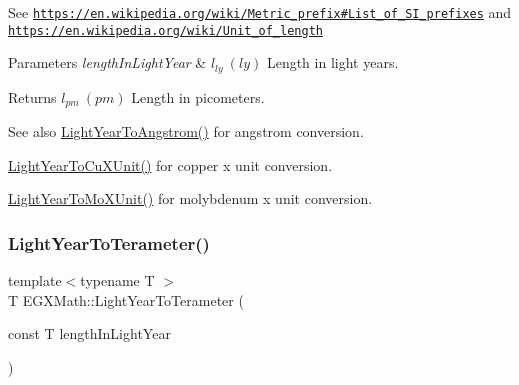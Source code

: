 See \href{https://en.wikipedia.org/wiki/Metric_prefix#List_of_SI_prefixes}{\tt https\+://en.\+wikipedia.\+org/wiki/\+Metric\+\_\+prefix\#\+List\+\_\+of\+\_\+\+S\+I\+\_\+prefixes} and \href{https://en.wikipedia.org/wiki/Unit_of_length}{\tt https\+://en.\+wikipedia.\+org/wiki/\+Unit\+\_\+of\+\_\+length} 
\begin{DoxyParams}{Parameters}
{\em length\+In\+Light\+Year} & $ l_{ly}\ (ly)$ Length in light years. \\
\hline
\end{DoxyParams}
\begin{DoxyReturn}{Returns}
$ l_{pm}\ (pm)$ Length in picometers. 
\end{DoxyReturn}
\begin{DoxySeeAlso}{See also}
\mbox{\hyperlink{group___e_g_x_math-_conversions-_length_conversions-_astronomical-_light_year-_non-_s_i_ga09634a7c514e3a0f573e7c171a791f78}{Light\+Year\+To\+Angstrom()}} for angstrom conversion. 

\mbox{\hyperlink{group___e_g_x_math-_conversions-_length_conversions-_astronomical-_light_year-_non-_s_i_ga2a345996e344d547ea6db8b7e9174ae8}{Light\+Year\+To\+Cu\+X\+Unit()}} for copper x unit conversion. 

\mbox{\hyperlink{group___e_g_x_math-_conversions-_length_conversions-_astronomical-_light_year-_non-_s_i_gac275191181b93d118ec2b21cf09ff356}{Light\+Year\+To\+Mo\+X\+Unit()}} for molybdenum x unit conversion. 
\end{DoxySeeAlso}
\mbox{\label{group___e_g_x_math-_conversions-_length_conversions-_astronomical-_light_year-_s_i_ga0813df48068b4379915d32afbb142d28}} 
\subsubsection{\texorpdfstring{Light\+Year\+To\+Terameter()}{LightYearToTerameter()}}
{\footnotesize\ttfamily template$<$typename T $>$ \\
T E\+G\+X\+Math\+::\+Light\+Year\+To\+Terameter (\begin{DoxyParamCaption}\item[{const T}]{length\+In\+Light\+Year }\end{DoxyParamCaption})}



